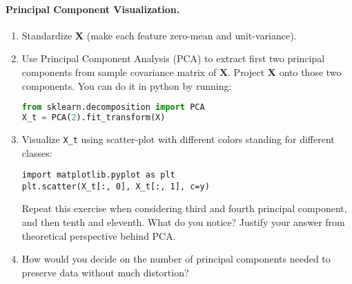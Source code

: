 \documentclass{article}
\begin{document}
\paragraph{Principal Component Visualization.}
\begin{enumerate}
\item Standardize $\boldsymbol{X}$ (make each feature zero-mean and unit-variance).
\item Use Principal Component Analysis (PCA) to extract first two principal components from sample covariance matrix of $\boldsymbol{X}$. Project $\boldsymbol{X}$ onto those two components.
You can do it in python by running:
\begin{lstlisting}[language=Python]
from sklearn.decomposition import PCA
X_t = PCA(2).fit_transform(X)
\end{lstlisting}
\item Visualize \verb!X_t! using scatter-plot with different colors standing for different classes:
\begin{lstlisting}
import matplotlib.pyplot as plt
plt.scatter(X_t[:, 0], X_t[:, 1], c=y)
\end{lstlisting}
Repeat this exercise when considering third and fourth principal component, and then tenth and eleventh.
What do you notice? Justify your answer from theoretical perspective behind PCA.
\item How would you decide on the number of principal components needed to preserve data without much distortion?
\end{enumerate}
\end{document}
